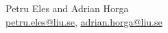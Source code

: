 Petru Eles and Adrian Horga\\
\vspace{0.5em}
\href{mailto:petru.eles@liu.se}{petru.eles@liu.se},
\href{mailto:petru.eles@liu.se}{adrian.horga@liu.se}

